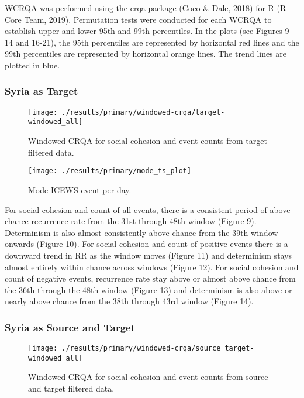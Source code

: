 \documentclass[english,man]{apa6}
\begin{document}
WCRQA was performed using the crqa package (Coco \& Dale, 2018) for R (R Core Team, 2019). Permutation tests were conducted for each WCRQA to establish upper and lower 95th and 99th percentiles. In the plots (see Figures 9-14 and 16-21), the 95th percentiles are represented by horizontal red lines and the 99th percentiles are represented by horizontal orange lines. The trend lines are plotted in blue.

\hypertarget{syria-as-target-1}{%
\subsubsection{Syria as Target}\label{syria-as-target-1}}

\begin{figure}
\texttt{[image: ./results/primary/windowed-crqa/target-windowed\_all]} \caption{Windowed CRQA for social cohesion and event counts from target filtered data.}\label{fig:plot-wcrqa-targ-all}
\end{figure}

\begin{figure}
\texttt{[image: ./results/primary/mode\_ts\_plot]} \caption{Mode ICEWS event per day.}\label{fig:plot-mode-event}
\end{figure}

For social cohesion and count of all events, there is a consistent period of above chance recurrence rate from the 31st through 48th window (Figure 9). Determinism is also almost consistently above chance from the 39th window onwards (Figure 10). For social cohesion and count of positive events there is a downward trend in RR as the window moves (Figure 11) and determinism stays almost entirely within chance across windows (Figure 12). For social cohesion and count of negative events, recurrence rate stay above or almost above chance from the 36th through the 48th window (Figure 13) and determinism is also above or nearly above chance from the 38th through 43rd window (Figure 14).

\hypertarget{syria-as-source-and-target-1}{%
\subsubsection{Syria as Source and Target}\label{syria-as-source-and-target-1}}

\begin{figure}
\texttt{[image: ./results/primary/windowed-crqa/source\_target-windowed\_all]} \caption{Windowed CRQA for social cohesion and event counts from source and target filtered data.}\label{fig:plot-wcrqa-source-targ-all}
\end{figure}
\end{document}
